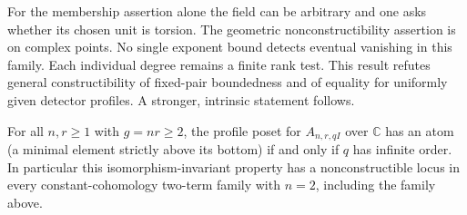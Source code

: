\documentclass[11pt]{article}
\begin{document}
For the membership assertion alone the field can be arbitrary and one
asks whether its chosen unit is torsion. The geometric nonconstructibility
assertion is on complex points. No single exponent bound detects eventual
vanishing in this family. Each individual degree remains a finite rank
test. This result refutes general constructibility of fixed-pair boundedness
and of equality for uniformly given detector profiles. A stronger, intrinsic statement follows.

\begin{thm}\label{atom}
For all $n,r\ge1$ with $g=nr\ge2$, the profile poset for
$A_{n,r,qI}$ over $\mathbb C$ has an atom (a minimal element strictly above
its bottom) if and only if $q$ has infinite order. In particular this
isomorphism-invariant property has a nonconstructible locus in every
constant-cohomology two-term family with $n=2$, including the family above.
\end{thm}
\end{document}
